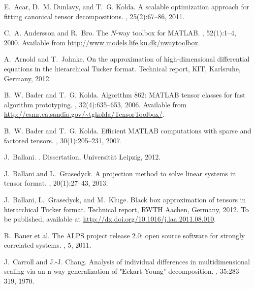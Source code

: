 \documentclass[11pt, a4paper]{article}
\begin{document}
\begin{thebibliography}{10}

E.~Acar, D.~M. Dunlavy, and T.~G. Kolda.
\newblock A scalable optimization approach for fitting canonical tensor
  decompositions.
, 25(2):67--86, 2011.

C.~A. Andersson and R.~Bro.
\newblock The {$N$-way} toolbox for {MATLAB}.
, 52(1):1--4,
  2000.
\newblock Available from \url{http://www.models.life.ku.dk/nwaytoolbox}.

A.~Arnold and T.~Jahnke.
\newblock On the approximation of high-dimensional differential equations in
  the hierarchical {T}ucker format.
\newblock Technical report, KIT, Karlsruhe, Germany, 2012.

B.~W. Bader and T.~G. Kolda.
\newblock Algorithm 862: {MATLAB} tensor classes for fast algorithm
  prototyping.
, 32(4):635--653, 2006.
\newblock Available from
  \url{http://csmr.ca.sandia.gov/~tgkolda/TensorToolbox/}.

B.~W. Bader and T.~G. Kolda.
\newblock Efficient {MATLAB} computations with sparse and factored tensors.
, 30(1):205--231, 2007.

J.~Ballani.
.
\newblock Dissertation, Universit\"at Leipzig, 2012.

J.~Ballani and L.~Grasedyck.
\newblock A projection method to solve linear systems in tensor format.
, 20(1):27--43, 2013.

J.~Ballani, L.~Grasedyck, and M.~Kluge.
\newblock Black box approximation of tensors in hierarchical {T}ucker format.
\newblock Technical report, RWTH Aachen, Germany, 2012.
\newblock To be published, available at
  \url{http://dx.doi.org/10.1016/j.laa.2011.08.010}.

B.~{Bauer et al.}
\newblock The {ALPS} project release 2.0: open source software for strongly
  correlated systems.
, 5, 2011.

J.~Carroll and J.-J. Chang.
\newblock Analysis of individual differences in multidimensional scaling via an
  n-way generalization of {"Eckart-Young"} decomposition.
, 35:283--319, 1970.


\end{thebibliography}
\end{document}
